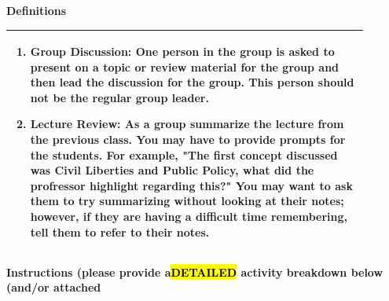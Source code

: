 \documentclass{article}
\begin{document}
\vspace{0.5cm}
{\large\textbf{Definitions}}
\\
\begin{tabular}{|p{0.9\linewidth}|}
\hline
\begin{minipage}[t]{0.9\linewidth}
\begin{enumerate}
    \item\textbf{Group Discussion:} One person in the group is asked to present on a topic or review material for the group and then lead the discussion for the group. This person should not be the regular group leader.
   \item\textbf{Lecture Review:} As a group summarize the lecture from the previous class. You may have to provide prompts for the students. For example, "The first concept discussed was Civil Liberties and Public Policy, what did the profressor highlight regarding this?" You may want to ask them to try summarizing without looking at their notes; however, if they are having a difficult time remembering, tell them to refer to their notes.
\end{enumerate}
\end{minipage} \\
\hline
\end{tabular}
\newpage
\noindent
{\large\textbf{Instructions (please provide a\hl{DETAILED} activity breakdown below (and/or attached}}\\
\end{document}
